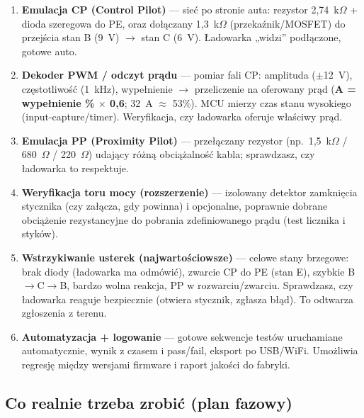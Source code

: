 \documentclass[11pt]{article}
\newcommand{\ra}{$\rightarrow$}
\begin{document}
\begin{enumerate}
  \item \textbf{Emulacja CP (Control Pilot)} --- sieć po stronie auta: rezystor 2,74~k$\Omega$ + dioda szeregowa do PE, oraz dołączany 1,3~k$\Omega$ (przekaźnik/MOSFET) do przejścia stan B (9~V) \ra{} stan C (6~V). Ładowarka „widzi” podłączone, gotowe auto.
  \item \textbf{Dekoder PWM / odczyt prądu} --- pomiar fali CP: amplituda ($\pm$12~V), częstotliwość (1~kHz), wypełnienie \ra{} przeliczenie na oferowany prąd (\textbf{A = wypełnienie \% $\times$ 0,6}; 32~A $\approx$ 53\%). MCU mierzy czas stanu wysokiego (input-capture/timer). Weryfikacja, czy ładowarka oferuje właściwy prąd.
  \item \textbf{Emulacja PP (Proximity Pilot)} --- przełączany rezystor (np.\ 1,5~k$\Omega$ / 680~$\Omega$ / 220~$\Omega$) udający różną obciążalność kabla; sprawdzasz, czy ładowarka to respektuje.
  \item \textbf{Weryfikacja toru mocy (rozszerzenie)} --- izolowany detektor zamknięcia stycznika (czy załącza, gdy powinna) i opcjonalne, poprawnie dobrane obciążenie rezystancyjne do pobrania zdefiniowanego prądu (test licznika i styków).
  \item \textbf{Wstrzykiwanie usterek (najwartościowsze)} --- celowe stany brzegowe: brak diody (ładowarka ma odmówić), zwarcie CP do PE (stan E), szybkie B\ra{}C\ra{}B, bardzo wolna reakcja, PP w rozwarciu/zwarciu. Sprawdzasz, czy ładowarka reaguje bezpiecznie (otwiera stycznik, zgłasza błąd). To odtwarza zgłoszenia z terenu.
  \item \textbf{Automatyzacja + logowanie} --- gotowe sekwencje testów uruchamiane automatycznie, wynik z czasem i pass/fail, eksport po USB/WiFi. Umożliwia regresję między wersjami firmware i raport jakości do fabryki.
\end{enumerate}

\subsection{Co realnie trzeba zrobić (plan fazowy)}
\end{document}
